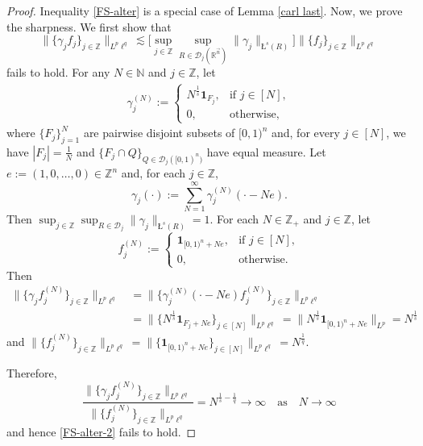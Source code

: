 \documentclass[11pt, reqno]{amsart}
\theoremstyle{definition}
\theoremstyle{remark}
\numberwithin{equation}{section}
\newcommand{\D}{\mathscr D}
\newcommand{\R}{\mathbb R}
\newcommand{\Z}{\mathbb Z}
\newcommand{\vn}{\vec n}
\newcommand{\one}{\mathbf{1}}
\newcommand{\aveL}{\textit{\L}}
\newcommand{\Norm}[2]{\|#1\|_{#2}}
\newcommand{\bNorm}[2]{\big\|#1\big\|_{#2}}
\begin{document}
\begin{proof}
Inequality \eqref{FS-alter} is a special case of Lemma \ref{carl last}.
Now, we prove the sharpness.
We first show that
\begin{equation}\label{FS-alter-2}
\bNorm{\{\gamma_jf_j\}_{j\in\mathbb Z}}{L^p\ell^q}
\lesssim \Big[\sup_{j\in\Z}\sup_{R\in\D_j(\R^{\vn})}
\Norm{\gamma_j}{\aveL^s(R)}\Big]
\bNorm{\{ f_j\}_{j\in\mathbb Z}}{L^p\ell^q}
\end{equation}
fails to hold. For any $N\in\mathbb N$ and $j\in\mathbb Z$, let
\begin{align*}
\gamma_j^{(N)}:=\begin{cases}
N^{\frac1s} \mathbf 1_{F_j},&
\text{if } j\in[N],\\
0,&\text{otherwise},
\end{cases}
\end{align*}
where $\{F_j\}_{j=1}^N$ are pairwise disjoint subsets
of $[0,1)^n$ and,
for every $j\in[N]$,
we have $|F_j|=\frac1N$ and
$\{F_j\cap Q\}_{Q\in \mathscr{D}_j([0,1)^n)}$
have equal measure.
Let $e:=(1,0,\ldots,0)\in\mathbb Z^n$ and, for each $j\in\Z$,
$$
\gamma_j(\cdot):=\sum_{N=1}^\infty \gamma_j^{(N)}(\cdot-Ne).
$$
Then $\sup_{j\in\Z}\sup_{R\in\D_j}
\Norm{\gamma_j}{\aveL^s(R)}=1$.
For each $N\in\Z_+$ and $j\in\mathbb Z$, let
$$
f_j^{(N)}:=\begin{cases}
\mathbf 1_{[0,1)^n+Ne},&
\text{if } j\in[N],\\
0,&\text{otherwise}.
\end{cases}
$$
Then
\begin{equation*}
\begin{split}
  \|\{\gamma_jf_j^{(N)}\}_{j\in\mathbb Z}\|_{L^p\ell^q}
  &=\|\{\gamma_j^{(N)}(\cdot-Ne)f_j^{(N)}\}_{j\in\mathbb Z}\|_{L^p\ell^q} \\
  &=\|\{ N^{\frac1s} \one_{F_j+Ne}\}_{j\in[N]}\|_{L^p\ell^q}
  =\| N^{\frac1s} \one_{[0,1)^n+Ne}\|_{L^p}  =N^{\frac1s}
\end{split}
\end{equation*}
and $\|\{f_j^{(N)}\}_{j\in\mathbb Z}\|_{L^p\ell^q}=\|\{ \one_{[0,1)^n+Ne}\}_{j\in[N]}\|_{L^p\ell^q}=N^{\frac1q}$.

Therefore,
$$
\frac{\|\{\gamma_jf_j^{(N)}\}_{j\in\mathbb Z}\|_{L^p\ell^q}}
{\|\{ f_j^{(N)}\}_{j\in\mathbb Z}\|_{L^p\ell^q}}
= N^{\frac1s-\frac1q}\to\infty
\quad\text{as}\quad N\to\infty
$$
and hence \eqref{FS-alter-2} fails to hold.


\end{proof}
\end{document}
